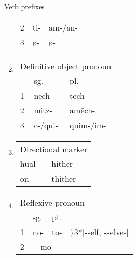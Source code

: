 \documentclass[12pt]{beamer}
\newcommand{\nah}[1]{\textcolor{nahgrn}{#1}}
\newcommand{\trs}[1]{\textcolor{nahblu}{#1}}
\begin{document}
\begin{frame}
\begin{columns}[t]
\begin{column}{0.18\linewidth}
\begin{block}{Verb prefixes}
\begin{enumerate}
\begin{threeparttable}
\begin{tabular}[t]{lll}
                    2 & \nah{ti-}\tnote{1} & \nah{am-/an-}\tnote{1} \\
                    3 & \nah{ø-}           & \nah{ø-}               \\
                  \end{tabular}
                \end{threeparttable}
          \item
                \begin{tabular}[t]{llll}
                  \multicolumn{3}{l}{Definitive object pronoun} \\
                    & sg.           & pl.                       \\
                  1 & \nah{nēch-}   & \nah{tēch-}               \\
                  2 & \nah{mitz-}   & \nah{amēch-}              \\
                  3 & \nah{c-/qui-} & \nah{quim-/im-}           \\
                \end{tabular}
          \item
                \begin{tabular}[t]{ll}
                  \multicolumn{2}{l}{Directional marker} \\
                  \nah{huāl} & \trs{hither}              \\
                  \nah{on}   & \trs{thither}             \\
                \end{tabular}
          \item
                \begin{tabular}[t]{llll}
                  \multicolumn{4}{l}{Reflexive pronoun}                                                              \\
                    & sg.                           & pl.       &                                                    \\
                  1 & \nah{no-}                     & \nah{to-} & \trs{\hspace{-1em}\rdelim\}{3}{*}[-self, -selves]} \\
                  2 & \multicolumn{2}{c}{\nah{mo-}}                                                                  \\

\end{tabular}
\end{enumerate}
\end{block}
\end{column}
\end{columns}
\end{frame}
\end{document}
